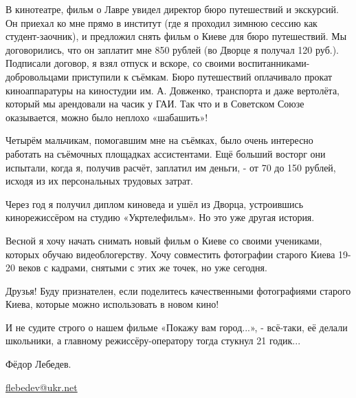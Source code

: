 В кинотеатре, фильм о Лавре увидел директор бюро путешествий и экскурсий. Он
приехал ко мне прямо в институт (где я проходил зимнюю сессию как
студент-заочник), и  предложил снять фильм о Киеве для бюро путешествий. Мы
договорились, что он заплатит мне 850 рублей (во Дворце я получал 120 руб.).
Подписали договор, я взял отпуск и вскоре, со своими
воспитанниками-добровольцами приступили к съёмкам. Бюро путешествий оплачивало
прокат киноаппаратуры на киностудии им. А. Довженко, транспорта и даже вертолёта,
который мы арендовали на часик у ГАИ. Так что и в Советском Союзе оказывается,
можно было неплохо «шабашить»!


Четырём мальчикам, помогавшим мне на съёмках, было очень интересно работать на
съёмочных площадках ассистентами. Ещё больший восторг они испытали, когда я,
получив расчёт, заплатил им деньги, - от 70 до 150 рублей, исходя из их
персональных  трудовых затрат.


Через год я получил диплом киноведа и ушёл из Дворца, устроившись
кинорежиссёром на студию «Укртелефильм». Но это уже другая история. 


Весной я хочу начать снимать новый фильм о Киеве со своими учениками, которых
обучаю видеоблогерству. Хочу совместить фотографии старого Киева 19-20 веков с
кадрами, снятыми с этих же точек, но уже сегодня.


Друзья! Буду признателен, если поделитесь качественными фотографиями старого
Киева, которые можно использовать в новом кино!

И не судите строго о нашем фильме «Покажу вам город...», - всё-таки, её делали
школьники, а главному режиссёру-оператору тогда стукнул 21 годик...

Фёдор Лебедев.

\url{flebedev@ukr.net}

